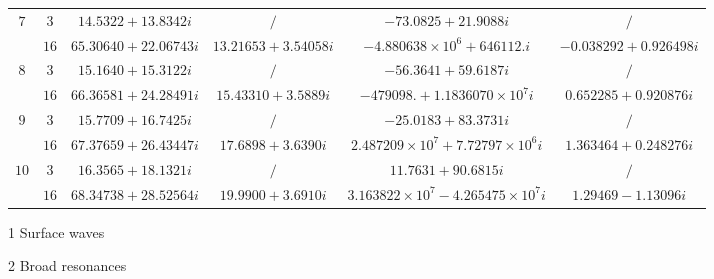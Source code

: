 \documentclass[aps,prd,longbibliography,reprint,twocolumn,amsmath,amssymb,amsfonts,showpacs,superscriptaddress]{revtex4-1}%
\begin{document}
\begin{table}[htp]
\begin{threeparttable}[htp]
\begin{ruledtabular}
\begin{tabular}{cccccc}
$7$  & $3$  & $14.5322+13.8342 i$  & $/$   & $-73.0825+21.9088 i$ & $/$     \\
     & $16$  & $65.30640+22.06743 i$  & $13.21653+3.54058 i$  & $-4.880638\times 10^6+646112. i$  & $-0.038292+0.926498 i$    \\

$8$  & $3$  & $15.1640+15.3122 i$  & $/$   & $-56.3641+59.6187 i$ & $/$     \\
     & $16$  & $66.36581+24.28491 i$  & $15.43310+3.5889 i$  & $-479098.+1.1836070\times 10^7 i$  & $0.652285+0.920876 i$    \\

$9$  & $3$  & $15.7709+16.7425 i$  & $/$   & $-25.0183+83.3731 i$ & $/$     \\
     & $16$  & $67.37659+26.43447 i$  & $17.6898+3.6390 i$  & $2.487209\times 10^7+7.72797\times 10^6 i$  & $1.363464+0.248276 i$    \\

$10$  & $3$  & $16.3565+18.1321 i$  & $/$   & $11.7631+90.6815 i$ & $/$     \\
     & $16$  & $68.34738+28.52564 i $  & $19.9900+3.6910 i$  & $3.163822\times 10^7-4.265475\times 10^7 i$  & $1.29469-1.13096 i$    \\
\end{tabular}
\end{ruledtabular}
\begin{tablenotes}
     \item[1] Surface waves
     \item[2] Broad resonances
   \end{tablenotes}
\end{threeparttable}
\end{table}
\endgroup
\end{document}
